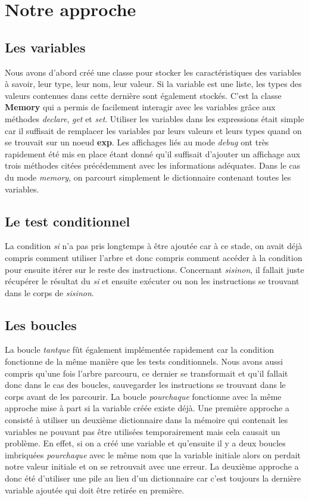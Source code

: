 \section{Notre approche}
\subsection{Les variables}
Nous avons d'abord créé une classe pour stocker les caractéristiques des variables à savoir, leur type, leur nom, leur valeur.
Si la variable est une liste, les types des valeurs contenues dans cette dernière sont également stockés.
C'est la classe \textbf{Memory} qui a permis de facilement interagir avec les variables grâce aux méthodes \textit{declare}, \textit{get} et \textit{set}.
Utiliser les variables dans les expressions était simple car il suffisait de remplacer les variables par leurs valeurs et leurs types
quand on se trouvait sur un noeud \textbf{exp}.
Les affichages liés au mode \textit{debug} ont très rapidement été mis en place étant donné qu'il suffisait d'ajouter
un affichage aux trois méthodes citées précédemment avec les informations adéquates.
Dans le cas du mode \textit{memory}, on parcourt simplement le dictionnaire contenant toutes les variables.

\subsection{Le test conditionnel}
La condition \textit{si} n'a pas pris longtemps à être ajoutée car à ce stade, on avait déjà compris comment utiliser l'arbre et
donc compris comment accéder à la condition pour ensuite itérer sur le reste des instructions. 
Concernant \textit{sisinon}, il fallait juste récupérer le résultat du \textit{si} et ensuite exécuter ou non
les instructions se trouvant dans le corps de \textit{sisinon}.

\subsection{Les boucles}
La boucle \textit{tantque} fût également implémentée rapidement car la condition fonctionne de la même manière que les tests conditionnels.
Nous avons aussi compris qu'une fois l'arbre parcouru, ce dernier se transformait et qu'il fallait donc dans le cas des boucles,
sauvegarder les instructions se trouvant dans le corps avant de les parcourir.
La boucle \textit{pourchaque} fonctionne avec la même approche mise à part si la variable créée existe déjà.
Une première approche a consisté à utiliser un deuxième dictionnaire dans la mémoire qui contenait les variables ne pouvant pas être utilisées temporairement
mais cela causait un problème.
En effet, si on a créé une variable et qu'ensuite il y a deux boucles imbriquées \textit{pourchaque} avec le même nom que la variable initiale
alors on perdait notre valeur initiale et on se retrouvait avec une erreur.
La deuxième approche a donc été d'utiliser une pile au lieu d'un dictionnaire car c'est toujours la dernière variable ajoutée qui doit être retirée en première.

